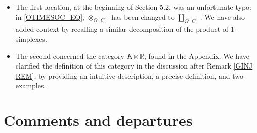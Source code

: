 \documentclass{article}
\begin{document}
\begin{itemize}
\item The first location, at the beginning of Section 5.2, was an unfortunate typo: %
      in \eqref{OTIMESOC_EQ}, $\otimes_{\Omega[C]}$ has been changed to $\coprod_{\Omega[C]}$.
      We have also added context by recalling a similar decomposition of the product of 1-simplexes.

\item The second concerned the category $K \ltimes \mathbb R$, found in the Appendix.
      We have clarified the definition of this category in the discussion after Remark \ref{GINJ REM},
      by providing an intuitive description, a precise definition, and two examples.
\end{itemize}

      

\section{Comments and departures} %
\end{document}

